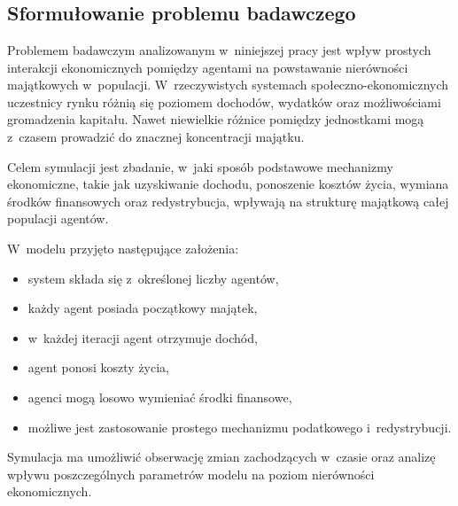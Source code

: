 \documentclass[polish]{projectreport}
\begin{document}
\section{\SectionTitleProblemSolution}
\label{sec:solution}

\subsection{Sformu\l{}owanie problemu badawczego}
\label{sec:problem}

Problemem badawczym analizowanym w~niniejszej pracy jest wp\l{}yw prostych interakcji
ekonomicznych pomi\k{e}dzy agentami na powstawanie nier\'owno\'sci maj\k{a}tkowych w~populacji.
W~rzeczywistych systemach spo\l{}eczno-ekonomicznych uczestnicy rynku r\'o\.{z}ni\k{a} si\k{e}
poziomem dochod\'ow, wydatk\'ow oraz mo\.{z}liwo\'sciami gromadzenia kapita\l{}u. Nawet niewielkie
r\'o\.{z}nice pomi\k{e}dzy jednostkami mog\k{a} z~czasem prowadzi\'{c} do znacznej koncentracji maj\k{a}tku.

Celem symulacji jest zbadanie, w~jaki spos\'ob podstawowe mechanizmy ekonomiczne,
takie jak uzyskiwanie dochodu, ponoszenie koszt\'ow \.{z}ycia, wymiana \'srodk\'ow finansowych
oraz redystrybucja, wp\l{}ywaj\k{a} na struktur\k{e} maj\k{a}tkow\k{a} ca\l{}ej populacji agent\'ow.

W~modelu przyj\k{e}to nast\k{e}puj\k{a}ce za\l{}o\.{z}enia:
\begin{itemize}
  \item system sk\l{}ada si\k{e} z~okre\'slonej liczby agent\'ow,
  \item ka\.{z}dy agent posiada pocz\k{a}tkowy maj\k{a}tek,
  \item w~ka\.{z}dej iteracji agent otrzymuje doch\'od,
  \item agent ponosi koszty \.{z}ycia,
  \item agenci mog\k{a} losowo wymienia\'{c} \'srodki finansowe,
  \item mo\.{z}liwe jest zastosowanie prostego mechanizmu podatkowego i~redystrybucji.
\end{itemize}

Symulacja ma umo\.{z}liwi\'{c} obserwacj\k{e} zmian zachodz\k{a}cych w~czasie oraz analiz\k{e} wp\l{}ywu
poszczeg\'olnych parametr\'ow modelu na poziom nier\'owno\'sci ekonomicznych.

\end{document}
